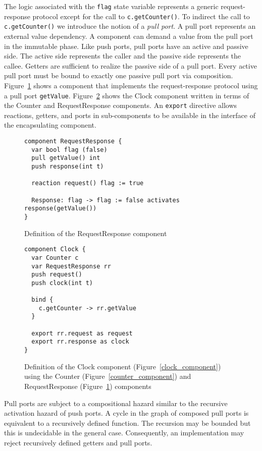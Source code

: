 The logic associated with the \verb+flag+ state variable represents a generic request-response protocol except for the call to \verb+c.getCounter()+.
To indirect the call to \verb+c.getCounter()+ we introduce the notion of a \emph{pull port}.
A pull port represents an external value dependency.
A component can demand a value from the pull port in the immutable phase.
Like push ports, pull ports have an active and passive side.
The active side represents the caller and the passive side represents the callee.
Getters are sufficient to realize the passive side of a pull port.
Every active pull port must be bound to exactly one passive pull port via composition.
Figure~\ref{request_response_component} shows a component that implements the request-response protocol using a pull port \verb+getValue+.
Figure~\ref{factored2_clock_component} shows the Clock component written in terms of the Counter and RequestResponse components.
An \verb+export+ directive allows reactions, getters, and ports in sub-components to be available in the interface of the encapsulating component.

\begin{figure}
\begin{verbatim}
component RequestResponse {
  var bool flag (false)
  pull getValue() int
  push response(int t)

  reaction request() flag := true

  Response: flag -> flag := false activates response(getValue())
}
\end{verbatim}
\caption{Definition of the RequestResponse component}
\label{request_response_component}
\end{figure}

\begin{figure}
\begin{verbatim}
component Clock {
  var Counter c
  var RequestResponse rr
  push request()
  push clock(int t)

  bind {
    c.getCounter -> rr.getValue
  }

  export rr.request as request
  export rr.response as clock
}
\end{verbatim}
\caption{Definition of the Clock component (Figure~\ref{clock_component}) using the Counter (Figure~\ref{counter_component}) and RequestResponse (Figure~\ref{request_response_component}) components}
\label{factored2_clock_component}
\end{figure}

Pull ports are subject to a compositional hazard similar to the recursive activation hazard of push ports.
A cycle in the graph of composed pull ports is equivalent to a recursively defined function.
The recursion may be bounded but this is undecidable in the general case.
Consequently, an implementation may reject recursively defined getters and pull ports.

